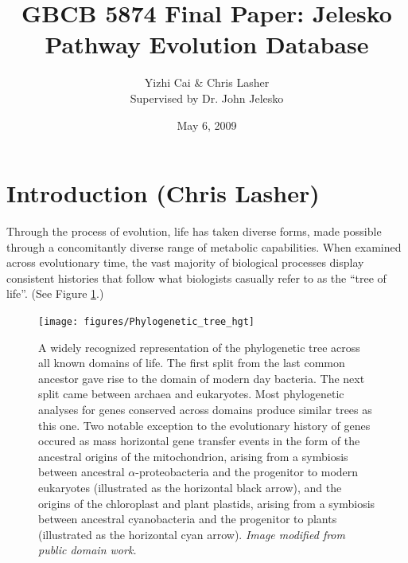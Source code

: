 \documentclass[11pt,letterpaper,twoside,english]{article}
\author{Yizhi Cai \& Chris Lasher\\
Supervised by Dr. John Jelesko}
\title{GBCB 5874 Final Paper: Jelesko Pathway Evolution Database}
\date{May 6, 2009}
\begin{document}
\maketitle

\section{Introduction (Chris Lasher)}

Through the process of evolution, life has taken diverse forms, made possible
through a concomitantly diverse range of metabolic capabilities. When examined
across evolutionary time, the vast majority of biological processes display
consistent histories that follow what biologists casually refer to as the
``tree of life''. (See Figure \ref{fig:tree_of_life}.)

\begin{figure}[htbp]
    \begin{center}
        \texttt{[image: figures/Phylogenetic\_tree\_hgt]}
    \end{center}
    \caption{A widely recognized representation of the phylogenetic tree
    across all known domains of life. The first split from the last common
    ancestor gave rise to the domain of modern day bacteria. The next split
    came between archaea and eukaryotes. Most phylogenetic analyses for genes
    conserved across domains produce similar trees as this one. Two notable
    exception to the evolutionary history of genes occured as mass horizontal
    gene transfer events in the form of the ancestral origins of the
    mitochondrion, arising from a symbiosis between ancestral
    $\alpha$-proteobacteria and the progenitor to modern eukaryotes
    (illustrated as the horizontal black arrow), and the origins of the
    chloroplast and plant plastids, arising from a symbiosis between ancestral
    cyanobacteria and the progenitor to plants (illustrated as the horizontal
    cyan arrow). \textit{Image modified from public domain work.}}
    \label{fig:tree_of_life}
\end{figure}
\end{document}
